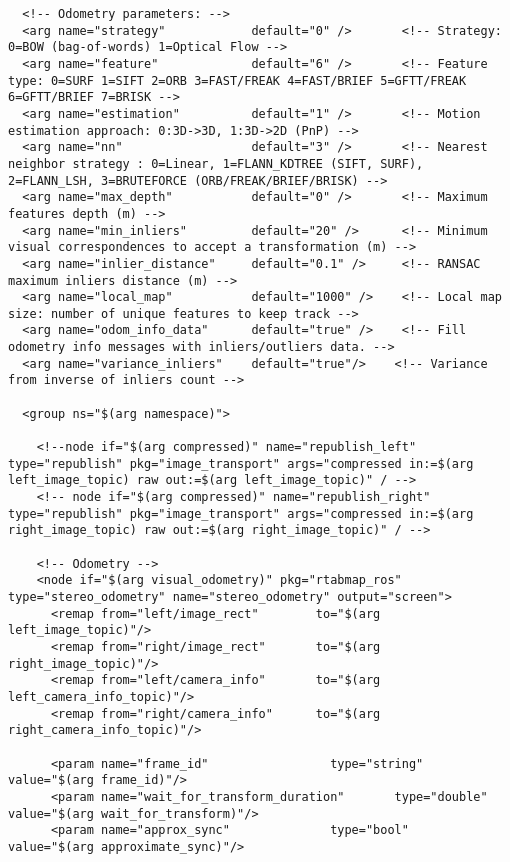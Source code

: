 \begin{center}
\begin{footnotesize}
\begin{verbatim}
  <!-- Odometry parameters: -->
  <arg name="strategy"            default="0" />       <!-- Strategy: 0=BOW (bag-of-words) 1=Optical Flow -->
  <arg name="feature"             default="6" />       <!-- Feature type: 0=SURF 1=SIFT 2=ORB 3=FAST/FREAK 4=FAST/BRIEF 5=GFTT/FREAK 6=GFTT/BRIEF 7=BRISK -->
  <arg name="estimation"          default="1" />       <!-- Motion estimation approach: 0:3D->3D, 1:3D->2D (PnP) -->
  <arg name="nn"                  default="3" />       <!-- Nearest neighbor strategy : 0=Linear, 1=FLANN_KDTREE (SIFT, SURF), 2=FLANN_LSH, 3=BRUTEFORCE (ORB/FREAK/BRIEF/BRISK) -->
  <arg name="max_depth"           default="0" />       <!-- Maximum features depth (m) -->
  <arg name="min_inliers"         default="20" />      <!-- Minimum visual correspondences to accept a transformation (m) -->
  <arg name="inlier_distance"     default="0.1" />     <!-- RANSAC maximum inliers distance (m) -->
  <arg name="local_map"           default="1000" />    <!-- Local map size: number of unique features to keep track -->
  <arg name="odom_info_data"      default="true" />    <!-- Fill odometry info messages with inliers/outliers data. -->
  <arg name="variance_inliers"    default="true"/>    <!-- Variance from inverse of inliers count -->  
        
  <group ns="$(arg namespace)">
  
    <!--node if="$(arg compressed)" name="republish_left"  type="republish" pkg="image_transport" args="compressed in:=$(arg left_image_topic) raw out:=$(arg left_image_topic)" / -->
    <!-- node if="$(arg compressed)" name="republish_right" type="republish" pkg="image_transport" args="compressed in:=$(arg right_image_topic) raw out:=$(arg right_image_topic)" / -->
  
    <!-- Odometry -->
    <node if="$(arg visual_odometry)" pkg="rtabmap_ros" type="stereo_odometry" name="stereo_odometry" output="screen">
      <remap from="left/image_rect"        to="$(arg left_image_topic)"/>
      <remap from="right/image_rect"       to="$(arg right_image_topic)"/>
      <remap from="left/camera_info"       to="$(arg left_camera_info_topic)"/>
      <remap from="right/camera_info"      to="$(arg right_camera_info_topic)"/>
	  
      <param name="frame_id"                 type="string" value="$(arg frame_id)"/>
      <param name="wait_for_transform_duration"       type="double"   value="$(arg wait_for_transform)"/>
      <param name="approx_sync"              type="bool"   value="$(arg approximate_sync)"/>
	  

\end{verbatim}
\end{footnotesize}
\end{center}
